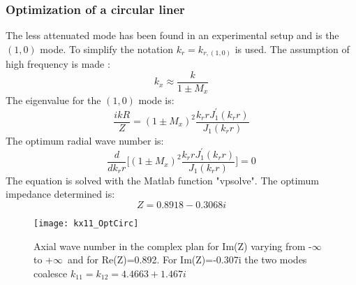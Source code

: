 \subsubsection{Optimization of a circular liner}

The less attenuated mode has been found in an experimental setup and is the $(1,0)$ mode. To simplify the notation $k_r=k_{r,(1,0)}$ is used. The assumption of high frequency is made \cite{Kabral_thesis}: 
\begin{equation}
    k_x\approx\frac{k}{1\pm M_x}
\end{equation}
The eigenvalue for the $(1,0)$ mode is:
\begin{equation}
   \frac{ikR}{Z}=(1\pm M_x)^2 \frac{k_r r J_1^' (k_r r)}{J_1(k_r r)}
\end{equation}
The optimum radial wave number is:
\begin{equation}
    \frac{d}{dk_r r}\Bigg[(1\pm M_x)^2 \frac{k_r r J_1^' (k_r r)}{J_1(k_r r)}\Bigg]=0
\end{equation}
The equation is solved with the Matlab function "vpsolve". The optimum impedance determined is: 
\begin{equation}
    Z=   0.8918 - 0.3068i
\end{equation}
\begin{figure}[H] \centering
    \texttt{[image: kx11\_OptCirc]}
    \caption{Axial wave number in the complex plan for Im(Z) varying from -$\infty$ to +$\infty$\ and for Re(Z)=0.892. For Im(Z)=-0.307i the two modes coalesce $k_{11}=k_{12}=4.4663 + 1.467i$ \cite{An_Introduction_to_Acoustics}}
\end{figure}
